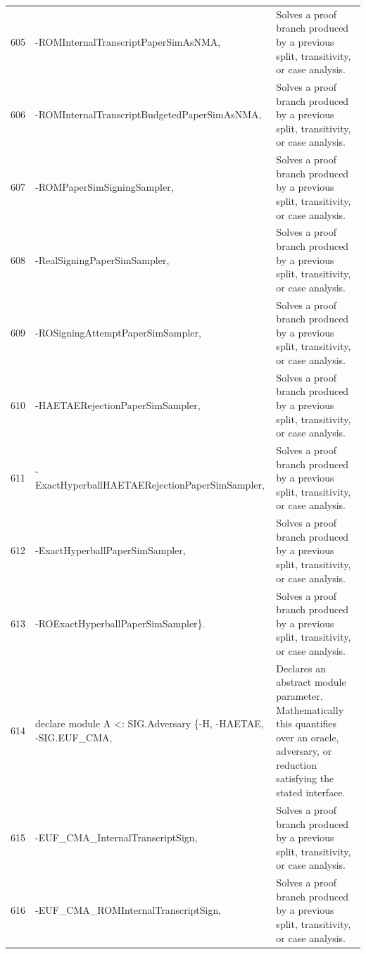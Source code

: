 \documentclass[10pt]{article}
\begin{document}
\begin{longtable}{r L{0.53\textwidth} L{0.37\textwidth}}
605 & {\ttfamily\scriptsize                                  -ROMInternalTranscriptPaperSimAsNMA,} & Solves a proof branch produced by a previous split, transitivity, or case analysis. \\
606 & {\ttfamily\scriptsize                                  -ROMInternalTranscriptBudgetedPaperSimAsNMA,} & Solves a proof branch produced by a previous split, transitivity, or case analysis. \\
607 & {\ttfamily\scriptsize                                  -ROMPaperSimSigningSampler,} & Solves a proof branch produced by a previous split, transitivity, or case analysis. \\
608 & {\ttfamily\scriptsize                                  -RealSigningPaperSimSampler,} & Solves a proof branch produced by a previous split, transitivity, or case analysis. \\
609 & {\ttfamily\scriptsize                                  -ROSigningAttemptPaperSimSampler,} & Solves a proof branch produced by a previous split, transitivity, or case analysis. \\
610 & {\ttfamily\scriptsize                                  -HAETAERejectionPaperSimSampler,} & Solves a proof branch produced by a previous split, transitivity, or case analysis. \\
611 & {\ttfamily\scriptsize                                  -ExactHyperballHAETAERejectionPaperSimSampler,} & Solves a proof branch produced by a previous split, transitivity, or case analysis. \\
612 & {\ttfamily\scriptsize                                  -ExactHyperballPaperSimSampler,} & Solves a proof branch produced by a previous split, transitivity, or case analysis. \\
613 & {\ttfamily\scriptsize                                  -ROExactHyperballPaperSimSampler\}.} & Solves a proof branch produced by a previous split, transitivity, or case analysis. \\
614 & {\ttfamily\scriptsize declare module A <: SIG.Adversary \{-H, -HAETAE, -SIG.EUF\_CMA,} & Declares an abstract module parameter.  Mathematically this quantifies over an oracle, adversary, or reduction satisfying the stated interface. \\
615 & {\ttfamily\scriptsize                                     -EUF\_CMA\_InternalTranscriptSign,} & Solves a proof branch produced by a previous split, transitivity, or case analysis. \\
616 & {\ttfamily\scriptsize                                     -EUF\_CMA\_ROMInternalTranscriptSign,} & Solves a proof branch produced by a previous split, transitivity, or case analysis. \\

\end{longtable}
\end{document}
